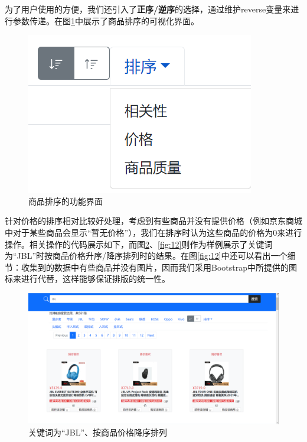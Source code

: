 \documentclass[a4paper,12pt]{article}
\begin{document}
    为了用户使用的方便，我们还引入了\textbf{正序/逆序}的选择，通过维护reverse变量来进行参数传递。在图\ref{fig:10}中展示了商品排序的可视化界面。

    \begin{figure}[H]
        \centering
        \includegraphics[scale=0.5]{pic/pic10.png}
        \caption{商品排序的功能界面}
        \label{fig:10}
    \end{figure}

    针对价格的排序相对比较好处理，考虑到有些商品并没有提供价格（例如京东商城中对于某些商品会显示“暂无价格”），我们在排序时认为这些商品的价格为0来进行操作。相关操作的代码展示如下，而图\ref{fig:11}、\ref{fig:12}则作为样例展示了关键词为“JBL”时按商品价格升序/降序排列时的结果。在图\ref{fig:12}中还可以看出一个细节：收集到的数据中有些商品并没有图片，因而我们采用Bootstrap中所提供的图标来进行代替，这样能够保证排版的统一性。

    \begin{figure}[H]
        \centering
        \includegraphics[scale=0.4]{pic/pic11.png}
        \caption{关键词为“JBL”、按商品价格降序排列}
        \label{fig:11}
    \end{figure}
\end{document}
